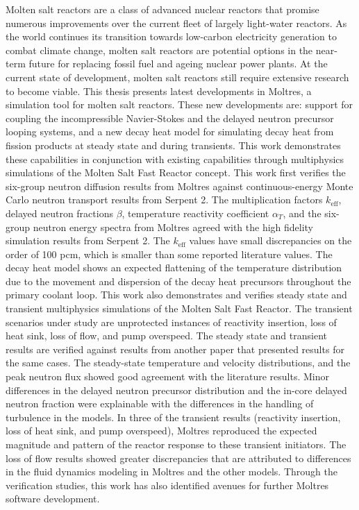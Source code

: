 Molten salt reactors are a class of advanced nuclear reactors that promise
numerous improvements over the current fleet of largely light-water reactors.
As the world continues its transition towards low-carbon electricity
generation to combat climate change, molten salt reactors are potential
options in the near-term future for replacing fossil fuel and ageing nuclear
power plants. At the current state of development, molten salt reactors still
require extensive research to become viable. This thesis presents latest
developments in Moltres, a simulation tool for molten salt reactors. These new
developments are: support for coupling the incompressible Navier-Stokes and
the delayed neutron precursor looping systems, and a new decay heat model for
simulating decay heat from fission products at steady state and during
transients. This work demonstrates these capabilities in conjunction with
existing capabilities through multiphysics simulations of the Molten Salt Fast
Reactor concept. This work first verifies the six-group neutron diffusion
results from Moltres against continuous-energy Monte Carlo neutron transport
results from Serpent 2. The multiplication factors $k_{\text{eff}}$, delayed
neutron fractions $\beta$, temperature reactivity coefficient $\alpha_T$, and
the six-group neutron energy spectra from Moltres agreed with the high
fidelity simulation results from Serpent 2. The $k_{\text{eff}}$ values have
small discrepancies on the order of 100 pcm, which is smaller than some
reported literature values. The decay heat model shows an expected flattening
of the temperature distribution due to the movement and dispersion of the
decay heat precursors throughout the primary coolant loop. This work also
demonstrates and verifies steady state and
transient multiphysics simulations of the Molten Salt Fast Reactor. The
transient scenarios under study are unprotected instances of reactivity
insertion, loss of heat sink, loss of flow, and pump overspeed. The steady
state and transient results are verified against results from another paper
that presented results for the same cases. The steady-state temperature and
velocity distributions, and the peak neutron flux showed good agreement with
the literature results. Minor differences in the delayed neutron precursor
distribution and the in-core delayed neutron fraction were explainable with
the differences in the handling of turbulence in the models. In three of the
transient results (reactivity insertion, loss of heat sink, and pump
overspeed), Moltres reproduced the expected magnitude and pattern of the
reactor response to these transient initiators.
The loss of flow results showed greater discrepancies that are attributed
to differences in the fluid dynamics modeling in Moltres and the other models.
Through the verification studies, this work has also identified avenues
for further Moltres software development.